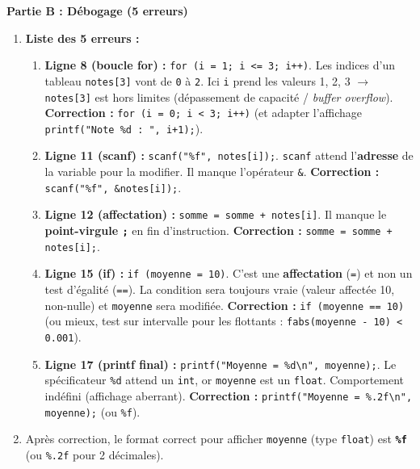 \documentclass[11pt]{article}
\begin{document}
\begin{corrige}
\textbf{Partie B : Débogage (5 erreurs)}
\begin{enumerate}
  \item[4.] \textbf{Liste des 5 erreurs :}
  \begin{enumerate}
    \item \textbf{Ligne 8 (boucle for) :} \texttt{for (i = 1; i <= 3; i++)}. Les indices d'un tableau \texttt{notes[3]} vont de \texttt{0} à \texttt{2}. Ici \texttt{i} prend les valeurs 1, 2, 3 $\rightarrow$ \texttt{notes[3]} est hors limites (dépassement de capacité / \emph{buffer overflow}). \textbf{Correction :} \texttt{for (i = 0; i < 3; i++)} (et adapter l'affichage \texttt{printf("Note \%d : ", i+1);}).
    \item \textbf{Ligne 11 (scanf) :} \texttt{scanf("\%f", notes[i]);}. \texttt{scanf} attend l'\textbf{adresse} de la variable pour la modifier. Il manque l'opérateur \texttt{\&}. \textbf{Correction :} \texttt{scanf("\%f", \&notes[i]);}.
    \item \textbf{Ligne 12 (affectation) :} \texttt{somme = somme + notes[i]}. Il manque le \textbf{point-virgule \texttt{;}} en fin d'instruction. \textbf{Correction :} \texttt{somme = somme + notes[i];}.
    \item \textbf{Ligne 15 (if) :} \texttt{if (moyenne = 10)}. C'est une \textbf{affectation} (\texttt{=}) et non un test d'égalité (\texttt{==}). La condition sera toujours vraie (valeur affectée 10, non-nulle) et \texttt{moyenne} sera modifiée. \textbf{Correction :} \texttt{if (moyenne == 10)} (ou mieux, test sur intervalle pour les flottants : \texttt{fabs(moyenne - 10) < 0.001}).
    \item \textbf{Ligne 17 (printf final) :} \texttt{printf("Moyenne = \%d\textbackslash n", moyenne);}. Le spécificateur \texttt{\%d} attend un \texttt{int}, or \texttt{moyenne} est un \texttt{float}. Comportement indéfini (affichage aberrant). \textbf{Correction :} \texttt{printf("Moyenne = \%.2f\textbackslash n", moyenne);} (ou \texttt{\%f}).
  \end{enumerate}
  \item[5.] Après correction, le format correct pour afficher \texttt{moyenne} (type \texttt{float}) est \textbf{\texttt{\%f}} (ou \texttt{\%.2f} pour 2 décimales).
\end{enumerate}
\end{corrige}
\end{document}
